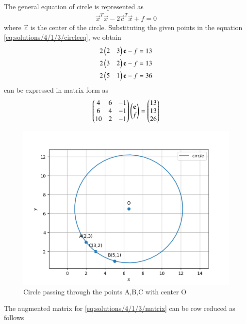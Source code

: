 The general equation of circle is represented as
\begin{align}
    \label{eq:solutions/4/1/3/circleeq}
    \vec{x}^T\vec{x}-2\vec{c}^T\vec{x}+f=0
\end{align}
where $\vec{c}$ is the center of the circle. Substituting the given points in the equation \eqref{eq:solutions/4/1/3/circleeq}, we obtain
\begin{align}
    \label{eq:solutions/4/1/3/points}
    2\begin{pmatrix}2&3\end{pmatrix}\mathbf{c}-f=13\\
    2\begin{pmatrix}3&2\end{pmatrix}\mathbf{c}-f=13\\
    2\begin{pmatrix}5&1\end{pmatrix}\mathbf{c}-f=36
\end{align}
can be expressed in matrix form as 
\begin{align}
    \label{eq:solutions/4/1/3/matrix}
    \begin{pmatrix}4&6&-1\\6&4&-1\\10&2&-1\end{pmatrix}\begin{pmatrix}\mathbf{c}\\f\end{pmatrix}=\begin{pmatrix}13\\13\\26\end{pmatrix}
\end{align}
\begin{figure}[!ht]
\centering
\includegraphics[width=\columnwidth]{./solutions/4/1/3/Circle.png}
\caption{Circle passing through the points A,B,C with center O}
\label{eq:solutions/4/1/3/fig1}
\end{figure}
The augmented matrix for \eqref{eq:solutions/4/1/3/matrix} can be row reduced as follows

